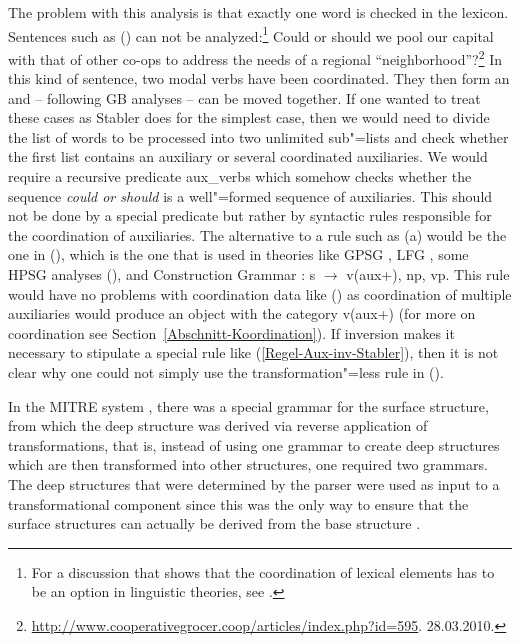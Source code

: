 The problem with this analysis is that exactly one word is checked in the lexicon. Sentences such as () can not be analyzed:\footnote{
  For a discussion that shows that the coordination of lexical elements has to be an option in linguistic theories, see .
} 
\ea
Could or should we pool our capital with that of other co-ops to address the needs of a regional
``neighborhood''?\footnote{
  \url{http://www.cooperativegrocer.coop/articles/index.php?id=595}. 28.03.2010.
}
\z
In this kind of sentence, two modal verbs have been coordinated. They then form an \xzero and -- following GB analyses -- can be
moved together. If one wanted to treat these cases as Stabler does for the simplest case, then we would need to divide the list of words to be
processed into two unlimited sub"=lists and check whether the first list contains an auxiliary or several coordinated auxiliaries. We would
require a recursive predicate aux\_verbs which somehow checks whether the sequence \emph{could or should} is a well"=formed sequence of 
auxiliaries. This should not be done by a special predicate but rather by syntactic rules responsible for the coordination of auxiliaries.
The alternative to a rule such as (a) would be the one in (), which is the one that
is used in theories like GPSG \citep[]{GKPS85a}, LFG \citep[]{Falk84a-u}, some HPSG analyses
(\citealp[]{GSag2000a-u}), and Construction Grammar
\citep{Fillmore99a}:%
\ea
s $\to$ v(aux+), np, vp.
\z
This rule would have no problems with coordination data like () as coordination of multiple auxiliaries would produce an object with the
category v(aux+) (for more on coordination see Section~\ref{Abschnitt-Koordination}). If inversion
makes it necessary to stipulate a special rule like (\ref{Regel-Aux-inv-Stabler}), then it is not clear why one could not simply use the transformation"=less rule in ().

In the MITRE system \citep{ZFHW65a}, there was a special grammar for the surface structure, from which the deep structure was derived via
reverse application of transformations, that is, instead of using one grammar to create deep structures which are then transformed into
other structures, one required two grammars. The deep structures that were determined by the parser
were used as input to a transformational component since this was the only way to ensure that
the surface structures can actually be derived from the base structure \citep[]{Kay2011a}.

